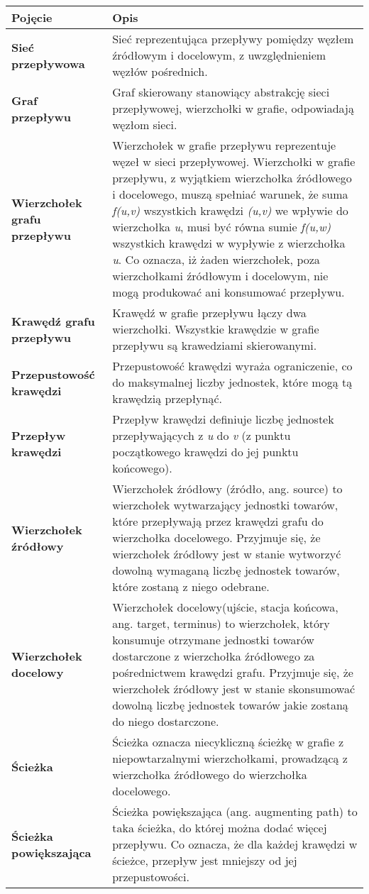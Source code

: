 \documentclass[10pt]{dokument-tiwo}
\begin{document}
\begin{longtable}{@{} >{\bfseries}p{} @{\hspace{0.02\textwidth}} p{} @{}}
\toprule
Pojęcie & \bfseries{Opis} \\
\toprule
Sieć przepływowa  &
Sieć reprezentująca przepływy pomiędzy węzłem źródłowym i docelowym, z
uwzględnieniem węzłów pośrednich.\\
\midrule
Graf przepływu &
Graf skierowany stanowiący abstrakcję sieci przepływowej, wierzchołki w grafie,
odpowiadają węzłom sieci.\\
\midrule
Wierzchołek grafu przepływu &
Wierzchołek w grafie przepływu reprezentuje węzeł w sieci przepływowej.
Wierzchołki w grafie przepływu, z wyjątkiem wierzchołka źródłowego i docelowego,
muszą spełniać warunek, że suma \emph{f(u,v)} wszystkich krawędzi \emph{(u,v)}
we wpływie do wierzchołka \emph{u}, musi być równa sumie \emph{f(u,w)}
wszystkich krawędzi w wypływie z wierzchołka \emph{u}. Co oznacza, iż żaden
wierzchołek, poza wierzchołkami źródłowym i docelowym, nie mogą produkować ani
konsumować przepływu.\\
\midrule
Krawędź grafu przepływu &
Krawędź w grafie przepływu łączy dwa wierzchołki. Wszystkie krawędzie w grafie
przepływu są krawedziami skierowanymi.\\
\midrule
Przepustowość krawędzi &
Przepustowość krawędzi wyraża ograniczenie, co do maksymalnej liczby jednostek,
które mogą tą krawędzią przepłynąć.\\
\midrule
Przepływ krawędzi &
Przepływ krawędzi definiuje liczbę jednostek przepływających z \emph{u} do
\emph{v} (z punktu początkowego krawędzi do jej punktu końcowego).\\
\midrule
Wierzchołek źródłowy &
Wierzchołek źródłowy (źródło, ang. source) to wierzchołek wytwarzający jednostki
towarów, które przepływają przez krawędzi grafu do wierzchołka docelowego.
Przyjmuje się, że wierzchołek źródłowy jest w stanie wytworzyć dowolną wymaganą
liczbę jednostek towarów, które zostaną z niego odebrane.\\
\midrule
Wierzchołek docelowy &
Wierzchołek docelowy(ujście, stacja końcowa, ang. target, terminus) to
wierzchołek, który konsumuje otrzymane jednostki towarów dostarczone z
wierzchołka źródłowego za pośrednictwem krawędzi grafu. Przyjmuje się, że
wierzchołek źródłowy jest w stanie skonsumować dowolną liczbę jednostek towarów
jakie zostaną do niego dostarczone.\\
\midrule
Ścieżka &
Ścieżka oznacza niecykliczną ścieżkę w grafie z niepowtarzalnymi wierzchołkami,
prowadzącą z wierzchołka źródłowego do wierzchołka docelowego.\\
\midrule
Ścieżka powiększająca &
Ścieżka powiększająca (ang. augmenting path) to taka ścieżka, do której można
dodać więcej przepływu. Co oznacza, że dla każdej krawędzi w ścieżce, przepływ
jest mniejszy od jej przepustowości.\\
\bottomrule
\end{longtable}
\end{document}
